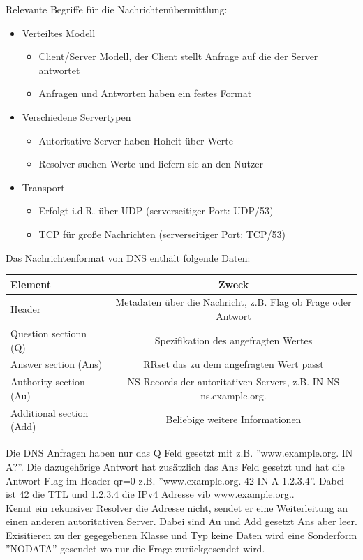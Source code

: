 \documentclass[a4paper,12pt,leqno]{article}
\begin{document}
Relevante Begriffe für die Nachrichtenübermittlung:
\begin{itemize}
\item Verteiltes Modell
	\begin{itemize}
	\item Client/Server Modell, der Client stellt Anfrage auf die der Server antwortet
	\item Anfragen und Antworten haben ein festes Format
	\end{itemize}
\item Verschiedene Servertypen
	\begin{itemize}
	\item Autoritative Server haben Hoheit über Werte
	\item Resolver suchen Werte und liefern sie an den Nutzer
	\end{itemize}
\item Transport 
	\begin{itemize}
	\item Erfolgt i.d.R. über UDP (serverseitiger Port: UDP/53)
	\item TCP für große Nachrichten (serverseitiger Port: TCP/53)
	\end{itemize}
\end{itemize}

Das Nachrichtenformat von DNS enthält folgende Daten:\\

\begin{tabular}{|l|c|}
\hline
Element & Zweck\\
\hline
Header & Metadaten über die Nachricht, z.B. Flag ob Frage oder Antwort\\
Question sectionn (Q) & Spezifikation des angefragten Wertes\\
Answer section (Ans) & RRset das zu dem angefragten Wert passt\\
Authority section (Au) & NS-Records der autoritativen Servers, z.B. IN NS ns.example.org.\\
Additional section (Add)& Beliebige weitere Informationen\\
\hline
\end{tabular}

Die DNS Anfragen haben nur das Q Feld gesetzt mit z.B. ''www.example.org. IN A?''. Die dazugehörige Antwort hat zusätzlich das Ans Feld gesetzt und hat die Antwort-Flag im Header qr=0 z.B. ''www.example.org. 42 IN A 1.2.3.4''. Dabei ist 42 die TTL und 1.2.3.4 die IPv4 Adresse vib www.example.org..\\
Kennt ein rekursiver Resolver die Adresse nicht, sendet er eine Weiterleitung an einen anderen autoritativen Server. Dabei sind Au und Add gesetzt Ans aber leer.\\
Exisitieren zu der gegegebenen Klasse und Typ keine Daten wird eine Sonderform ''NODATA'' gesendet wo nur die Frage zurückgesendet wird.
\end{document}

